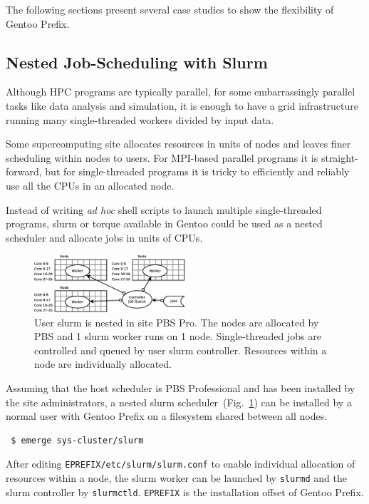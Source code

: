 \documentclass[a4paper,conference]{IEEEtran}
\begin{document}
The following sections present several case studies to show the
flexibility of Gentoo Prefix.

\subsection{Nested Job-Scheduling with Slurm}
\label{sec:slurm}
Although HPC programs are typically parallel, for some embarrassingly
parallel tasks like data analysis and simulation, it is enough to have
a grid infrastructure running many single-threaded workers divided by
input data.

Some supercomputing site allocates resources in units of nodes and
leaves finer scheduling within nodes to users. For MPI-based parallel
programs it is straight-forward, but for single-threaded programs it
is tricky to efficiently and reliably use all the CPUs in an allocated
node.

Instead of writing \textit{ad hoc} shell scripts to launch multiple
single-threaded programs, slurm or torque available in Gentoo could be
used as a nested scheduler and allocate jobs in units of
CPUs.

\begin{figure}[htb]
  \centering
  \includegraphics[width=0.5\textwidth]{node-slurm.eps}
  \caption{User slurm is nested in site PBS Pro. The nodes are
    allocated by PBS and 1 slurm worker runs on 1 node.
    Single-threaded jobs are controlled and queued by user slurm
    controller. Resources within a node are individually allocated.}
  \label{fig:slurm}
\end{figure}

Assuming that the host scheduler is PBS Professional and has been
installed by the site administrators, a nested slurm
scheduler~(Fig.~\ref{fig:slurm}) can be installed by a normal user with
Gentoo Prefix on a filesystem shared between all nodes.
\begin{verbatim} $ emerge sys-cluster/slurm \end{verbatim}
After editing \texttt{EPREFIX/etc/slurm/slurm.conf} to enable individual
allocation of resources within a node, the slurm worker can be launched by
\texttt{slurmd} and the slurm controller by \texttt{slurmctld}.
\texttt{EPREFIX} is the installation offset of Gentoo Prefix.
\end{document}
